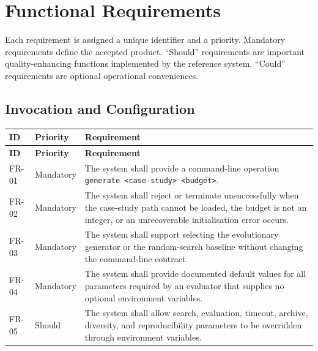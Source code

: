 \documentclass[11pt,a4paper,openany]{report}
\begin{document}
\section{Functional Requirements}
Each requirement is assigned a unique identifier and a priority. Mandatory requirements define the accepted product. ``Should'' requirements are important quality-enhancing functions implemented by the reference system. ``Could'' requirements are optional operational conveniences.

\subsection{Invocation and Configuration}
\begin{longtable}{L{1.7cm} L{2.1cm} L{10.8cm}}
\toprule
\textbf{ID} & \textbf{Priority} & \textbf{Requirement}\\
\midrule
\endfirsthead
\toprule
\textbf{ID} & \textbf{Priority} & \textbf{Requirement}\\
\midrule
\endhead
FR-01 & Mandatory & The system shall provide a command-line operation \texttt{generate <case-study> <budget>}.\\
FR-02 & Mandatory & The system shall reject or terminate unsuccessfully when the case-study path cannot be loaded, the budget is not an integer, or an unrecoverable initialisation error occurs.\\
FR-03 & Mandatory & The system shall support selecting the evolutionary generator or the random-search baseline without changing the command-line contract.\\
FR-04 & Mandatory & The system shall provide documented default values for all parameters required by an evaluator that supplies no optional environment variables.\\
FR-05 & Should & The system shall allow search, evaluation, timeout, archive, diversity, and reproducibility parameters to be overridden through environment variables.\\
\bottomrule
\end{longtable}
\end{document}

